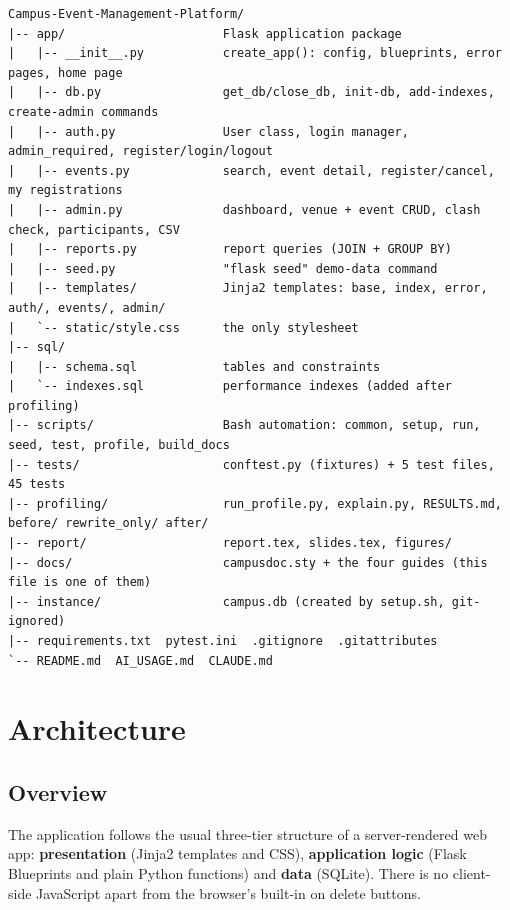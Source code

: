 \documentclass[11pt,a4paper]{article}
\begin{document}
\begin{lstlisting}[language={}, caption={Project tree (generated files such as venv/ and instance/ are git-ignored).}]
Campus-Event-Management-Platform/
|-- app/                      Flask application package
|   |-- __init__.py           create_app(): config, blueprints, error pages, home page
|   |-- db.py                 get_db/close_db, init-db, add-indexes, create-admin commands
|   |-- auth.py               User class, login manager, admin_required, register/login/logout
|   |-- events.py             search, event detail, register/cancel, my registrations
|   |-- admin.py              dashboard, venue + event CRUD, clash check, participants, CSV
|   |-- reports.py            report queries (JOIN + GROUP BY)
|   |-- seed.py               "flask seed" demo-data command
|   |-- templates/            Jinja2 templates: base, index, error, auth/, events/, admin/
|   `-- static/style.css      the only stylesheet
|-- sql/
|   |-- schema.sql            tables and constraints
|   `-- indexes.sql           performance indexes (added after profiling)
|-- scripts/                  Bash automation: common, setup, run, seed, test, profile, build_docs
|-- tests/                    conftest.py (fixtures) + 5 test files, 45 tests
|-- profiling/                run_profile.py, explain.py, RESULTS.md, before/ rewrite_only/ after/
|-- report/                   report.tex, slides.tex, figures/
|-- docs/                     campusdoc.sty + the four guides (this file is one of them)
|-- instance/                 campus.db (created by setup.sh, git-ignored)
|-- requirements.txt  pytest.ini  .gitignore  .gitattributes
`-- README.md  AI_USAGE.md  CLAUDE.md
\end{lstlisting}

\section{Architecture}

\subsection{Overview}

The application follows the usual three-tier structure of a server-rendered web app:
\textbf{presentation} (Jinja2 templates and CSS), \textbf{application logic} (Flask Blueprints and
plain Python functions) and \textbf{data} (SQLite). There is no client-side JavaScript apart from the
browser's built-in  on delete buttons.
\end{document}
